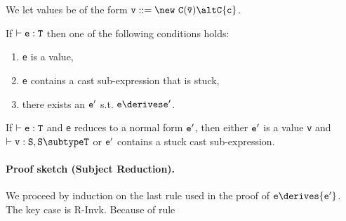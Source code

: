 We let values be of the form $\tt v ::= \new\ C(\bar{\tt v}) \alt C\{c\}$.

\begin{theorem}[Progress]
If $\vdash {\tt e:T}$ then one of the following conditions holds:
\begin{enumerate}
\item {\tt e} is a value,
\item {\tt e} contains a cast sub-expression that is stuck,
\item there exists an $\tt e'$ s.t. $\tt e\derives e'$.
\end{enumerate}
\end{theorem}

\begin{theorem}
If $\vdash {\tt e:T}$ and {\tt e}
reduces to a normal form ${\tt e'}$, then
either $\tt e'$ is a value {\tt v} and $\vdash {\tt v:S},{\tt S\subtype T}$ or
${\tt e'}$ contains  a stuck cast sub-expression.
\end{theorem}










\paragraph{Proof sketch (Subject Reduction).} We proceed by induction on the last rule used in the proof of ${\tt e} \derives {\tt e'}$. The key case is {\sc R-Invk}. Because of rule 


